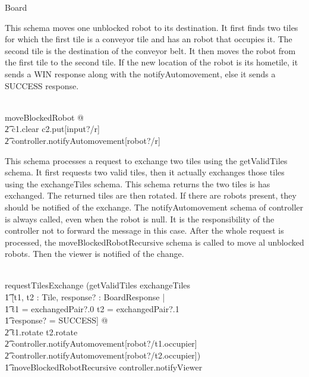\begin{class}{Board}
\begin{zpar}
This schema moves one unblocked robot to its destination. It first finds two tiles for which the first tile is a conveyor tile and has an robot that occupies it. The second tile is the destination of the conveyor belt. It then moves the robot from the first tile to the second tile. If the new location of the robot is its hometile, it sends a WIN response along with the notifyAutomovement, else it sends a SUCCESS response.
\end{zpar} \\
moveBlockedRobot \sdef [c1, c2 : \dom tiles, r : \dom robots, \\ \t1 response? : BoardResponse | \\ \t1 tiles(c1) \in ConveyorTile \wedge tiles(c1).occupier = r \; \; \wedge \\ \t1 conveyorDest(c1) \not = c1 \wedge conveyorDest(c1) = c2 \; \; \wedge \\ \t1
(\IF tiles(c2) \in HomeTile \wedge tiles(c2).target = r \\ \t1
\THEN response? = WIN \\ \t1
\ELSE response? = SUCCESS)] @ \\ \t2 c1.clear \wedge c2.put[input?/r] \; \; \wedge \\ \t2 controller.notifyAutomovement[robot?/r] \\
\znewpage
\begin{zpar}
This schema processes a request to exchange two tiles using the getValidTiles schema. It first requests two valid tiles, then it actually exchanges those tiles using the exchangeTiles schema.
This schema returns the two tiles is has exchanged. The returned tiles are then rotated. If there are robots present, they should
be notified of the exchange. The notifyAutomovement schema of controller is always called, even when the robot is null. It is the responsibility of the controller not to forward the message in this case.
After the whole request is processed, the moveBlockedRobotRecursive schema is called to move al unblocked robots. Then the viewer is notified of the change.
\end{zpar} \\
requestTilesExchange \sdef (getValidTiles \comp exchangeTiles \; \; \comp \\
\t1 [t1, t2 : Tile, response? : BoardResponse | \\ \t1 t1 = exchangedPair?.0 \wedge t2 = exchangedPair?.1 \; \; \wedge \\ \t1 response? = SUCCESS] @ \\ \t2 t1.rotate \wedge t2.rotate \; \; \wedge \\ \t2 controller.notifyAutomovement[robot?/t1.occupier] \; \; \wedge \\ \t2 controller.notifyAutomovement[robot?/t2.occupier]) \; \; \comp \\ \t1 moveBlockedRobotRecursive \comp controller.notifyViewer \\

\end{class}
